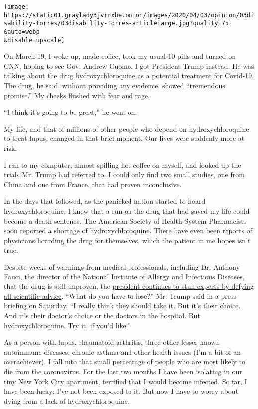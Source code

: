 \texttt{[image: https://static01.graylady3jvrrxbe.onion/images/2020/04/03/opinion/03disability-torres/03disability-torres-articleLarge.jpg?quality=75\\\&auto=webp\\\&disable=upscale]}

On March 19, I woke up, made coffee, took my usual 10 pills and turned
on CNN, hoping to see Gov. Andrew Cuomo. I got President Trump instead.
He was talking about the drug
\href{https://www.nytimes3xbfgragh.onion/2020/03/19/health/coronavirus-drugs-chloroquine.html}{hydroxychloroquine
as a potential treatment} for Covid-19. The drug, he said, without
providing any evidence, showed ``tremendous promise.'' My cheeks flushed
with fear and rage.

``I think it's going to be great,'' he went on.

My life, and that of millions of other people who depend on
hydroxychloroquine to treat lupus, changed in that brief moment. Our
lives were suddenly more at risk.

I ran to my computer, almost spilling hot coffee on myself, and looked
up the trials Mr. Trump had referred to. I could only find two small
studies, one from China and one from France, that had proven
inconclusive.

In the days that followed, as the panicked nation started to hoard
hydroxychloroquine, I knew that a run on the drug that had saved my life
could become a death sentence. The American Society of Health-System
Pharmacists soon
\href{https://www.ashp.org/Drug-Shortages/Current-Shortages/Drug-Shortage-Detail.aspx?id=646}{reported
a shortage} of hydroxychloroquine. There have even been
\href{https://www.nytimes3xbfgragh.onion/2020/03/24/business/doctors-buying-coronavirus-drugs.html}{reports
of physicians hoarding the drug} for themselves, which the patient in me
hopes isn't true.

Despite weeks of warnings from medical professionals, including Dr.
Anthony Fauci, the director of the National Institute of Allergy and
Infectious Diseases, that the drug is still unproven, the
\href{https://www.nytimes3xbfgragh.onion/2020/04/05/us/politics/trump-hydroxychloroquine-coronavirus.html}{president
continues to stun experts by defying all scientific advice}. ``What do
you have to lose?'' Mr. Trump said in a press briefing on Saturday. ``I
really think they should take it. But it's their choice. And it's their
doctor's choice or the doctors in the hospital. But hydroxychloroquine.
Try it, if you'd like.''

As a person with lupus, rheumatoid arthritis, three other lesser known
autoimmune diseases, chronic asthma and other health issues (I'm a bit
of an overachiever), I fall into that small percentage of people who are
most likely to die from the coronavirus. For the last two months I have
been isolating in our tiny New York City apartment, terrified that I
would become infected. So far, I have been lucky; I've not been exposed
to it. But now I have to worry about dying from a lack of
hydroxychloroquine.

